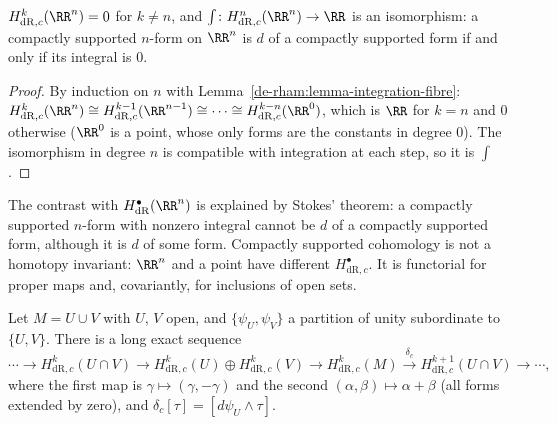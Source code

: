 \begin{proposition}\label{de-rham:proposition-compact-poincare}
$H^k_{\mathrm{dR},c}(\RR^n) = 0$ for $k \neq n$, and $\int \colon H^n_{\mathrm{dR},c}(\RR^n) \to \RR$ is an isomorphism: a compactly supported $n$-form on $\RR^n$ is $d$ of a compactly supported form if and only if its integral is $0$.
\end{proposition}

\begin{proof}
By induction on $n$ with Lemma~\ref{de-rham:lemma-integration-fibre}: $H^k_{\mathrm{dR},c}(\RR^n) \cong H^{k-1}_{\mathrm{dR},c}(\RR^{n-1}) \cong \cdots \cong H^{k-n}_{\mathrm{dR},c}(\RR^0)$, which is $\RR$ for $k = n$ and $0$ otherwise
($\RR^0$ is a point, whose only forms are the constants in degree $0$). The isomorphism in degree $n$ is compatible with integration at each step, so it is $\int$.
\end{proof}

The contrast with $H^\bullet_{\mathrm{dR}}(\RR^n)$ is explained by Stokes' theorem: a compactly supported $n$-form with nonzero integral cannot be $d$ of a compactly supported form, although it is $d$ of some form. Compactly
supported cohomology is not a homotopy invariant: $\RR^n$ and a point have different $H^\bullet_{\mathrm{dR},c}$. It is functorial for proper maps and, covariantly, for inclusions of open sets.

\begin{proposition}\label{de-rham:proposition-mayer-vietoris-compact}
Let $M = U \cup V$ with $U$, $V$ open, and $\{\psi_U, \psi_V\}$ a partition of unity subordinate to $\{U, V\}$. There is a long exact sequence
\[
\cdots \to H^k_{\mathrm{dR},c}(U \cap V) \to H^k_{\mathrm{dR},c}(U) \oplus H^k_{\mathrm{dR},c}(V) \to H^k_{\mathrm{dR},c}(M) \xrightarrow{\ \delta_c\ } H^{k+1}_{\mathrm{dR},c}(U \cap V) \to \cdots,
\]
where the first map is $\gamma \mapsto (\gamma, -\gamma)$ and the second $(\alpha, \beta) \mapsto \alpha + \beta$ (all forms extended by zero), and $\delta_c[\tau] = [d\psi_U \wedge \tau]$.
\end{proposition}

